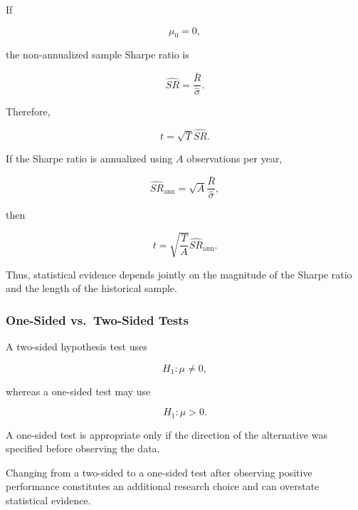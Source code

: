 \documentclass[11pt,a4paper]{article}
\begin{document}
If

\begin{equation}
\mu_0=0,
\end{equation}

the non-annualized sample Sharpe ratio is

\begin{equation}
\widehat{SR}
=
\frac{
\bar{R}
}{
\widehat{\sigma}
}.
\end{equation}

Therefore,

\begin{equation}
\boxed{
t
=
\sqrt{T}
\widehat{SR}.
}
\end{equation}

If the Sharpe ratio is annualized using $A$ observations per year,

\begin{equation}
\widehat{SR}_{\mathrm{ann}}
=
\sqrt{A}
\frac{
\bar{R}
}{
\widehat{\sigma}
},
\end{equation}

then

\begin{equation}
\boxed{
t
=
\sqrt{
\frac{T}{A}
}
\widehat{SR}_{\mathrm{ann}}.
}
\end{equation}

Thus, statistical evidence depends jointly on the magnitude of the Sharpe ratio
and the length of the historical sample.


\subsubsection{One-Sided vs.\ Two-Sided Tests}

A two-sided hypothesis test uses

\begin{equation}
H_1:
\mu\neq0,
\end{equation}

whereas a one-sided test may use

\begin{equation}
H_1:
\mu>0.
\end{equation}

A one-sided test is appropriate only if the direction of the alternative was
specified before observing the data.

Changing from a two-sided to a one-sided test after observing positive
performance constitutes an additional research choice and can overstate
statistical evidence.


\end{document}
